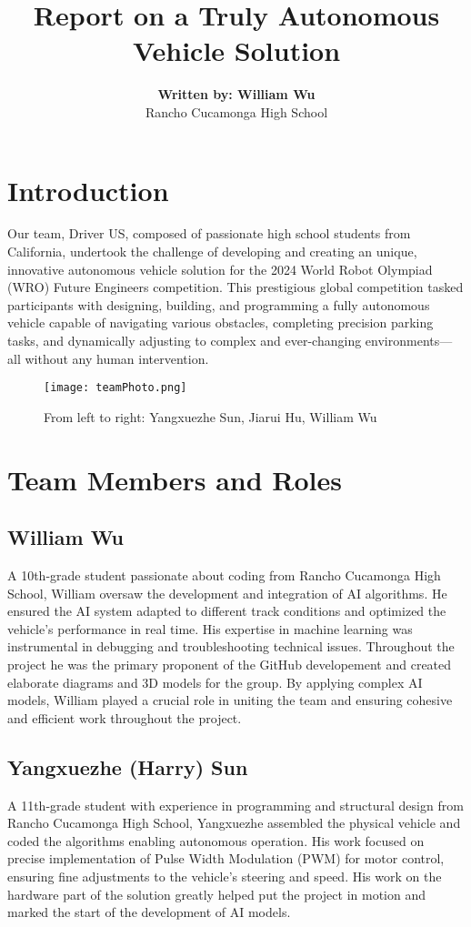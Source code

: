 \documentclass{article}
\title{\textbf{Report on a Truly Autonomous Vehicle Solution}}
\author{\textbf{Written by: William Wu}\\ Rancho Cucamonga High School}
\date{}
\newcommand\BackgroundIm{\put(0,670){\texttt{[image: header.png]}}}
\begin{document}
    \AddToShipoutPicture*{\BackgroundIm}
    \maketitle
    \begin{multicols}{2}
            \section*{Introduction}
       Our team, Driver US, composed of passionate high school students from California, undertook the challenge of developing and creating an unique, innovative autonomous vehicle solution for the 2024 World Robot Olympiad (WRO) Future Engineers competition. This prestigious global competition tasked participants with designing, building, and programming a fully autonomous vehicle capable of navigating various obstacles, completing precision parking tasks, and dynamically adjusting to complex and ever-changing environments—all without any human intervention.

       \begin{figure}[H]
           \centering
           \texttt{[image: teamPhoto.png]}
           \caption{From left to right: Yangxuezhe Sun, Jiarui Hu, William Wu}
           \label{fig:enter-label}
       \end{figure}

    \vspace{1cm}
            \section*{Team Members and Roles}
\subsection{William Wu}
A 10th-grade student passionate about coding from Rancho Cucamonga High School, William oversaw the development and integration of AI algorithms. He ensured the AI system adapted to different track conditions and optimized the vehicle's performance in real time. His expertise in machine learning was instrumental in debugging and troubleshooting technical issues. Throughout the project he was the primary proponent of the GitHub developement and created elaborate diagrams and 3D models for the group. By applying complex AI models, William played a crucial role in uniting the team and ensuring cohesive and efficient work throughout the project.

\subsection{Yangxuezhe (Harry) Sun}
A 11th-grade student with experience in programming and structural design from Rancho Cucamonga High School, Yangxuezhe assembled the physical vehicle and coded the algorithms enabling autonomous operation. His work focused on precise implementation of Pulse Width Modulation (PWM) for motor control, ensuring fine adjustments to the vehicle’s steering and speed. His work on the hardware part of the solution greatly helped put the project in motion and marked the start of the development of AI models.


\end{multicols}
\end{document}
